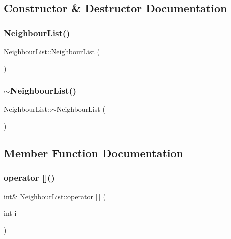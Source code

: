 \subsection{Constructor \& Destructor Documentation}
\mbox{\label{struct_neighbour_list_ab376c095d360ea03b0e499a8820bd0e7}} 
\subsubsection{\texorpdfstring{NeighbourList()}{NeighbourList()}}
{\footnotesize\ttfamily Neighbour\+List\+::\+Neighbour\+List (\begin{DoxyParamCaption}{ }\end{DoxyParamCaption})}

\mbox{\label{struct_neighbour_list_afcdbcc7fde83d4ce3a4fecc8d4105cd8}} 
\subsubsection{\texorpdfstring{$\sim$NeighbourList()}{~NeighbourList()}}
{\footnotesize\ttfamily Neighbour\+List\+::$\sim$\+Neighbour\+List (\begin{DoxyParamCaption}{ }\end{DoxyParamCaption})}



\subsection{Member Function Documentation}
\mbox{\label{struct_neighbour_list_a9bd6ad04ef1eb6ad9737ac493b6864d1}} 
\subsubsection{\texorpdfstring{operator []()}{operator []()}}
{\footnotesize\ttfamily int\& Neighbour\+List\+::operator \mbox{[}$\,$\mbox{]} (\begin{DoxyParamCaption}\item[{int}]{i }\end{DoxyParamCaption})\hspace{0.3cm}{\ttfamily [inline]}}



